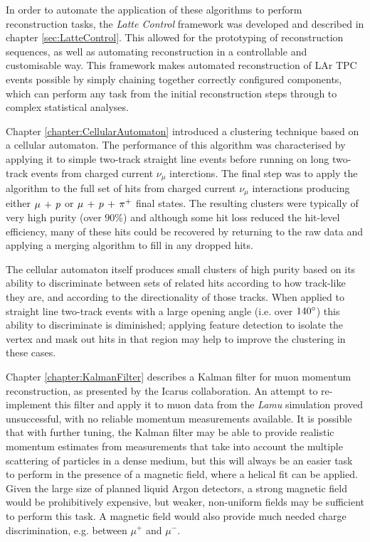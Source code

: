 In order to automate the application of these algorithms to perform reconstruction tasks, the \emph{Latte Control} framework was developed and described in chapter \ref{sec:LatteControl}. This allowed for the prototyping of reconstruction sequences, as well as automating reconstruction in a controllable and customisable way. This framework makes automated reconstruction of \ac{LAr TPC} events possible by simply chaining together correctly configured components, which can perform any task from the initial reconstruction steps through to complex statistical analyses.

Chapter \ref{chapter:CellularAutomaton} introduced a clustering technique based on a cellular automaton. The performance of this algorithm was characterised by applying it to simple two-track straight line events before running on long two-track events from charged current $\nu_\mu$ interctions. The final step was to apply the algorithm to the full set of hits from charged current $\nu_\mu$ interactions producing either $\mu\,+\,p$ or $\mu\,+\,p\,+\,\pi^{+}$ final states. The resulting clusters were typically of very high purity (over $90\%$) and although some hit loss reduced the hit-level efficiency, many of these hits could be recovered by returning to the raw data and applying a merging algorithm to fill in any dropped hits.

The cellular automaton itself produces small clusters of high purity based on its ability to discriminate between sets of related hits according to how track-like they are, and according to the directionality of those tracks. When applied to straight line two-track events with a large opening angle (i.e. over $140^\circ$) this ability to discriminate is diminished; applying feature detection to isolate the vertex and mask out hits in that region may help to improve the clustering in these cases.

Chapter \ref{chapter:KalmanFilter} describes a Kalman filter for muon momentum reconstruction, as presented by the Icarus collaboration. An attempt to re-implement this filter and apply it to muon data from the \emph{Lamu} simulation proved unsuccessful, with no reliable momentum measurements available. It is possible that with further tuning, the Kalman filter may be able to provide realistic momentum estimates from measurements that take into account the multiple scattering of particles in a dense medium, but this will always be an easier task to perform in the presence of a magnetic field, where a helical fit can be applied. Given the large size of planned liquid Argon detectors, a strong magnetic field would be prohibitively expensive, but weaker, non-uniform fields may be sufficient to perform this task. A magnetic field would also provide much needed charge discrimination, e.g. between $\mu^+$ and $\mu^-$.

